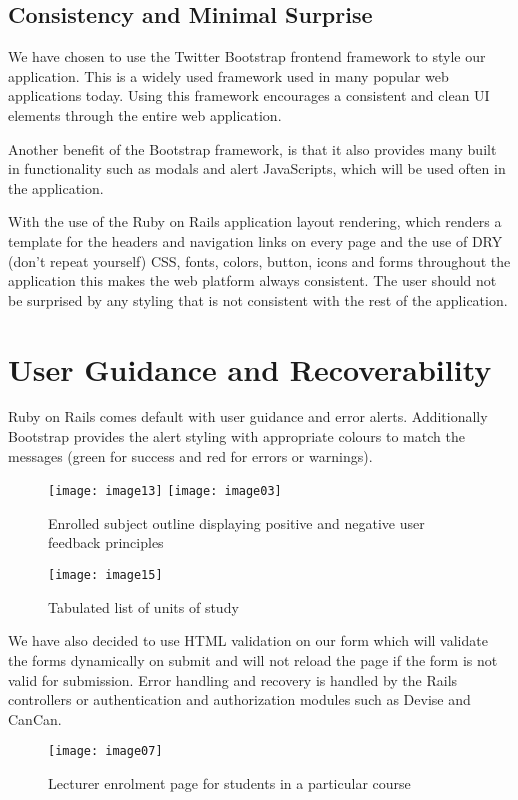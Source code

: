 \documentclass{article}
\begin{document}
\subsection{Consistency and Minimal Surprise}
We have chosen to use the Twitter Bootstrap frontend framework to style our application. This is a widely used framework used in many popular web applications today. Using this framework encourages a consistent and clean UI elements through the entire web application. 

Another benefit of the Bootstrap framework, is that it also provides many built in functionality such as modals and alert JavaScripts, which will be used often in the application.

With the use of the Ruby on Rails application layout rendering, which renders a template for the headers and navigation links on every page and the use of DRY (don't repeat yourself) CSS, fonts, colors, button, icons and forms throughout the application this makes the web platform always consistent. The user should not be surprised by any styling that is not consistent with the rest of the application.

\clearpage
\section{User Guidance and Recoverability}
Ruby on Rails comes default with user guidance and error alerts. Additionally Bootstrap provides the alert styling with appropriate colours to match the messages (green for success and red for errors or warnings). 

\begin{figure}[h!]
\centering
\texttt{[image: image13]}
\texttt{[image: image03]}
\caption{Enrolled subject outline displaying positive and negative user feedback principles}
\end{figure}

\begin{figure}[h!]
\centering
\texttt{[image: image15]}
\caption{Tabulated list of units of study}
\end{figure}

\clearpage
We have also decided to use HTML validation on our form which will validate the forms dynamically on submit and will not reload the page if the form is not valid for submission. Error handling and recovery is handled by the Rails controllers or authentication and authorization modules such as Devise and CanCan.

\begin{figure}[h!]
\centering
\texttt{[image: image07]}
\caption{Lecturer enrolment page for students in a particular course}
\end{figure}
\end{document}
